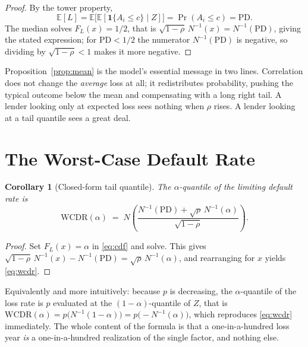 \documentclass[11pt]{article}
\newtheorem{corollary}{Corollary}
\theoremstyle{remark}
\theoremstyle{definition}
\begin{document}
\begin{proof}
By the tower property,
\begin{equation*}
\mathbb{E}[L] = \mathbb{E}\big[\mathbb{E}[\mathbf{1}\{A_i\le c\}\mid Z]\big]
 = \Pr(A_i \le c) = \text{PD}.
\end{equation*}
The median solves $F_L(x)=1/2$, that is $\sqrt{1-\rho}\,N^{-1}(x) = N^{-1}(\text{PD})$, giving the stated expression; for $\text{PD}<1/2$ the numerator $N^{-1}(\text{PD})$ is negative, so dividing by $\sqrt{1-\rho}<1$ makes it more negative.
\end{proof}

Proposition~\ref{prop:mean} is the model's essential message in two lines. Correlation does not change the \emph{average} loss at all; it redistributes probability, pushing the typical outcome below the mean and compensating with a long right tail. A lender looking only at expected loss sees nothing when $\rho$ rises. A lender looking at a tail quantile sees a great deal.

\section{The Worst-Case Default Rate}
\label{sec:wcdr}

\begin{corollary}[Closed-form tail quantile]
\label{cor:wcdr}
The $\alpha$-quantile of the limiting default rate is
\begin{equation}
\label{eq:wcdr}
\boxed{\;\text{WCDR}(\alpha) \;=\; N\!\left(\frac{N^{-1}(\text{PD}) + \sqrt{\rho}\,N^{-1}(\alpha)}{\sqrt{1-\rho}}\right).\;}
\end{equation}
\end{corollary}

\begin{proof}
Set $F_L(x)=\alpha$ in \eqref{eq:cdf} and solve. This gives $\sqrt{1-\rho}\,N^{-1}(x) - N^{-1}(\text{PD}) = \sqrt{\rho}\,N^{-1}(\alpha)$, and rearranging for $x$ yields \eqref{eq:wcdr}.
\end{proof}

Equivalently and more intuitively: because $p$ is decreasing, the $\alpha$-quantile of the loss rate is $p$ evaluated at the $(1-\alpha)$-quantile of $Z$, that is $\text{WCDR}(\alpha) = p\big(N^{-1}(1-\alpha)\big) = p\big(-N^{-1}(\alpha)\big)$, which reproduces \eqref{eq:wcdr} immediately. The whole content of the formula is that a one-in-a-hundred loss year \emph{is} a one-in-a-hundred realization of the single factor, and nothing else.
\end{document}
